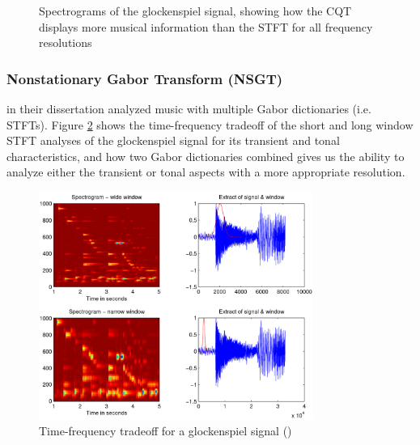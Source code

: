 \documentclass[report.tex]{subfiles}
\begin{document}
\begin{figure}[ht]
	\hspace{0.1em}
	\caption{Spectrograms of the glockenspiel signal, showing how the CQT displays more musical information than the STFT for all frequency resolutions}
	\label{fig:cqtvstft}
\end{figure}

\newpagefill

\subsubsection{Nonstationary Gabor Transform (NSGT)}
\label{sec:theorynsgt}

\textcite{doerflerphd} in their dissertation analyzed music with multiple Gabor dictionaries (i.e. STFTs). Figure \ref{fig:dorflertradeoff} shows the time-frequency tradeoff of the short and long window STFT analyses of the glockenspiel signal for its transient and tonal characteristics, and how two Gabor dictionaries combined gives us the ability to analyze either the transient or tonal aspects with a more appropriate resolution.

\begin{figure}[ht]
	\centering
	\includegraphics[width=0.8\textwidth]{./images-tftheory/tf_tradeoff_dorfler.png}
	\caption{Time-frequency tradeoff for a glockenspiel signal (\cite[20]{doerflerphd})}
	\label{fig:dorflertradeoff}
\end{figure}
\end{document}
